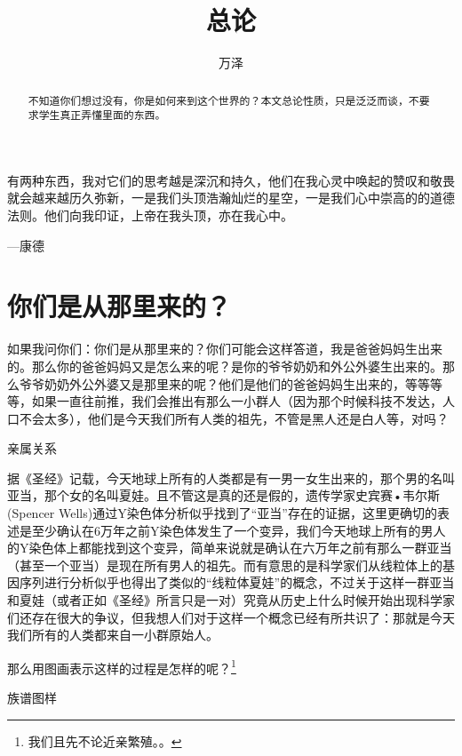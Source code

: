 \documentclass[12pt]{exam}%
\begin{document}
\begin{coverpages}
\title{总论}
\author{万泽}
\maketitle
\begin{abstract}
不知道你们想过没有，你是如何来到这个世界的？本文总论性质，只是泛泛而谈，不要求学生真正弄懂里面的东西。
\end{abstract}
\tableofcontents
\end{coverpages}
\begin{flushright}
\begin{notecard}[blue!30]{20em}
\ttfamily
有两种东西，我对它们的思考越是深沉和持久，他们在我心灵中唤起的赞叹和敬畏就会越来越历久弥新，一是我们头顶浩瀚灿烂的星空，一是我们心中崇高的的道德法则。他们向我印证，上帝在我头顶，亦在我心中。

{\vspace{-10pt}\hfill\sffamily —康德}
\end{notecard}
\end{flushright}
\section{你们是从那里来的？}
如果我问你们：你们是从那里来的？你们可能会这样答道，我是爸爸妈妈生出来的。那么你的爸爸妈妈又是怎么来的呢？是你的爷爷奶奶和外公外婆生出来的。那么爷爷奶奶外公外婆又是那里来的呢？他们是他们的爸爸妈妈生出来的，等等等等，如果一直往前推，我们会推出有那么一小群人（因为那个时候科技不发达，人口不会太多），他们是今天我们所有人类的祖先，不管是黑人还是白人等，对吗？

\begin{linefig}[0.8]{亲属关系}
\end{linefig}

据《圣经》记载，今天地球上所有的人类都是有一男一女生出来的，那个男的名叫亚当，那个女的名叫夏娃。且不管这是真的还是假的，遗传学家史宾赛•韦尔斯(Spencer Wells)通过Y染色体分析似乎找到了“亚当”存在的证据，这里更确切的表述是至少确认在6万年之前Y染色体发生了一个变异，我们今天地球上所有的男人的Y染色体上都能找到这个变异，简单来说就是确认在六万年之前有那么一群亚当（甚至一个亚当）是现在所有男人的祖先。而有意思的是科学家们从线粒体上的基因序列进行分析似乎也得出了类似的“线粒体夏娃”的概念，不过关于这样一群亚当和夏娃（或者正如《圣经》所言只是一对）究竟从历史上什么时候开始出现科学家们还存在很大的争议，但我想人们对于这样一个概念已经有所共识了：那就是今天我们所有的人类都来自一小群原始人。

那么用图画表示这样的过程是怎样的呢？\footnote{我们且先不论近亲繁殖。。}
\begin{linefig}[0.9]{族谱图样}
\end{linefig}
\end{document}
